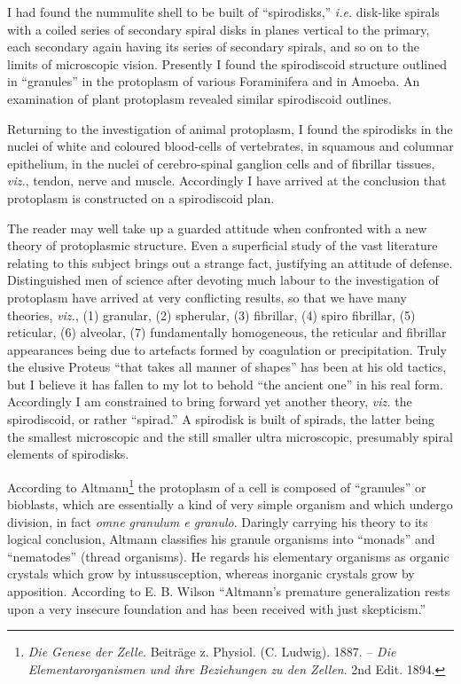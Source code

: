 \documentclass[a4paper, 12pt, oneside]{article}
\begin{document}
I had found the nummulite shell to be built of ``spirodisks,'' \emph{i.e.} disk-like spirals with a coiled series of secondary spiral disks in planes vertical to the primary, each secondary again having its series of secondary spirals, and so on to the limits of microscopic vision. Presently I found the spirodiscoid structure outlined in ``granules'' in the protoplasm of various Foraminifera and in Amoeba. An examination of plant protoplasm revealed similar spirodiscoid outlines.

Returning to the investigation of animal protoplasm, I found the spirodisks in the nuclei of white and coloured blood-cells of vertebrates, in squamous and columnar epithelium, in the nuclei of cerebro-spinal ganglion cells and of fibrillar tissues, \emph{viz.}, tendon, nerve and muscle. Accordingly I have arrived at the conclusion that protoplasm is constructed on a spirodiscoid plan.

The reader may well take up a guarded attitude when confronted with a new theory of protoplasmic structure. Even a superficial study of the vast literature relating to this subject brings out a strange fact, justifying an attitude of defense. Distinguished men of science after devoting much labour to the investigation of protoplasm have arrived at very conflicting results, so that we have many theories, \emph{viz.}, (1) granular, (2) spherular, (3) fibrillar, (4) spiro fibrillar, (5) reticular, (6) alveolar, (7) fundamentally homogeneous, the reticular and fibrillar appearances being due to artefacts formed by coagulation or precipitation. Truly the elusive Proteus ``that takes all manner of shapes'' has been at his old tactics, but I believe it has fallen to my lot to behold ``the ancient one'' in his real form. Accordingly I am constrained to bring forward yet another theory, \emph{viz.} the spirodiscoid, or rather ``spirad.'' A spirodisk is built of spirads, the latter being the smallest microscopic and the still smaller ultra microscopic, presumably spiral elements of spirodisks.

According to Altmann\footnote{\emph{Die Genese der Zelle}. Beiträge z. Physiol. (C. Ludwig). 1887. -- \emph{Die Elementarorganismen und ihre Beziehungen zu den Zellen}. 2nd Edit. 1894.} the protoplasm of a cell is composed of ``granules'' or bioblasts, which are essentially a kind of very simple organism and which undergo division, in fact \emph{omne granulum e granulo}. Daringly carrying his theory to its logical conclusion, Altmann classifies his granule organisms into ``monads'' and ``nematodes'' (thread organisms). He regards his elementary organisms as organic crystals which grow by intussusception, whereas inorganic crystals grow by apposition. According to E. B. Wilson ``Altmann's premature generalization rests upon a very insecure foundation and has been received with just skepticism.''
\end{document}
